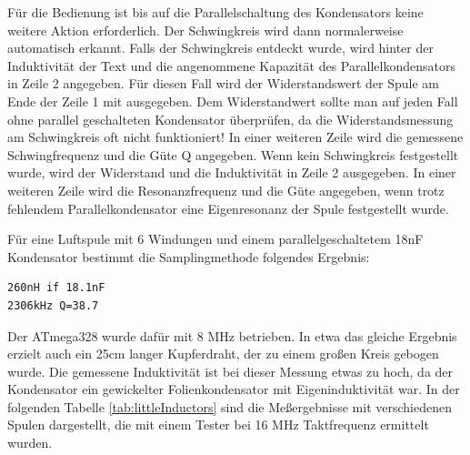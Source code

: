 Für die Bedienung ist bis auf die Parallelschaltung des Kondensators keine weitere
Aktion erforderlich. Der Schwingkreis wird dann normalerweise automatisch erkannt.
Falls der Schwingkreis entdeckt wurde, wird hinter der Induktivität der Text
 und die angenommene Kapazität des Parallelkondensators in Zeile 2 angegeben.
Für diesen Fall wird der Widerstandswert der Spule am Ende der Zeile 1 mit ausgegeben.
Dem Widerstandwert sollte man auf jeden Fall ohne parallel geschalteten Kondensator überprüfen,
da die Widerstandsmessung am Schwingkreis oft nicht funktioniert!
In einer weiteren Zeile wird die gemessene Schwingfrequenz und die Güte Q angegeben.
Wenn kein Schwingkreis festgestellt wurde, wird der Widerstand und die Induktivität
in Zeile 2 ausgegeben. In einer weiteren Zeile wird die Resonanzfrequenz und die
Güte angegeben, wenn trotz fehlendem Parallelkondensator eine Eigenresonanz der Spule
festgestellt wurde.

Für eine Luftspule mit 6 Windungen und einem parallelgeschaltetem 18nF Kondensator
bestimmt die Samplingmethode folgendes Ergebnis:

\begin{verbatim}
260nH if 18.1nF
2306kHz Q=38.7
\end{verbatim}

Der ATmega328 wurde dafür mit 8 MHz betrieben. In etwa das gleiche Ergebnis erzielt auch
ein 25cm langer Kupferdraht, der zu einem großen Kreis gebogen wurde.
Die gemessene Induktivität ist bei dieser Messung etwas zu hoch, da der Kondensator ein
gewickelter Folienkondensator mit Eigeninduktivität war.
In der folgenden Tabelle \ref{tab:littleInductors} sind die Meßergebnisse mit verschiedenen
Spulen dargestellt, die mit einem Tester bei 16 MHz Taktfrequenz ermittelt wurden.

